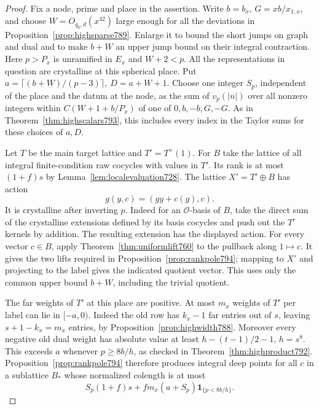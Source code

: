 \documentclass[a4paper,11pt]{article}
\theoremstyle{definition}
\theoremstyle{remark}
\numberwithin{equation}{section}
\begin{document}
\begin{proof}
Fix a node, prime and place in the assertion. Write \(b=b_x\),
\(G=xb/x_{1,x}\), and choose \(W=O_{q_0,d}(x^{42})\)
large enough for all the deviations in
Proposition~\ref{prop:highsparse789}. Enlarge it to bound the
short jumps on graph and dual and to make \(b+W\) an upper
jump bound on their integral contraction. Here \(p>P_x\)
is unramified in \(E_x\) and \(W+2<p\). All the representations
in question are crystalline at this spherical place. Put
\(a=\lceil(b+W)/(p-3)\rceil,\ D=a+W+1\).
Choose one integer \(S_p\), independent of the place and
the datum at the node, as the sum of \(v_p(|n|)\) over all
nonzero integers within \(C(W+1+b/P_x)\) of one of
\(0,b,-b,G,-G\). As in Theorem~\ref{thm:highscalars793},
this includes every index in the Taylor sums for these
choices of \(a,D\).

Let \(T\) be the main target lattice and
\(T'=T^\vee(1)\). For \(B\) take the lattice of all
integral finite-condition raw cocycles with values in \(T'\).
Its rank is at most \((1+f)s\) by Lemma~\ref{lem:localevaluation728}.
The lattice \(X'=T'\oplus B\) has action
\[
               g(y,c)=(gy+c(g),c).
\]
It is crystalline after inverting \(p\). Indeed for an
\(\mathcal O\)-basis of \(B\), take the direct sum of the
crystalline extensions defined by its basis cocycles and
push out the \(T'\) kernels by addition. The resulting
extension has the displayed action. For every vector
\(c\in B\), apply Theorem~\ref{thm:uniformlift760} to the
pullback along \(1\mapsto c\). It gives the two lifts
required in Proposition~\ref{prop:rankpole794}; mapping
to \(X'\) and projecting to the label gives the indicated
quotient vector. This uses only the common upper bound
\(b+W\), including the trivial quotient.

The far weights of \(T'\) at this place are positive.
At most \(m_x\) weights of \(T'\) per label can lie in
\([-a,0)\). Indeed the old row has \(k_x-1\) far entries
out of \(s\), leaving \(s+1-k_x=m_x\) entries, by
Proposition~\ref{prop:highwidth788}. Moreover every
negative old dual weight has absolute value at least
\(h-(t-1)/2-1\), \(h=s^8\). This exceeds \(a\) whenever
\(p\ge8b/h\), as checked in Theorem~\ref{thm:highproduct792}.
Proposition~\ref{prop:rankpole794} therefore produces integral
deep points for all \(c\) in a sublattice \(B_*\) whose
normalized colength is at most
\[
       S_p(1+f)s+
        f m_x(a+S_p)\mathbf 1_{\{p<8b/h\}} .
\]


\end{proof}
\end{document}
